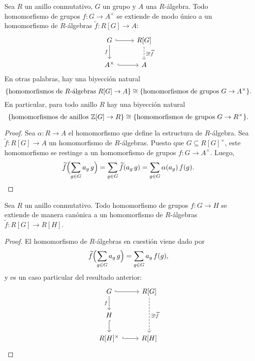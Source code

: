 \begin{proposicion}
  \label{prop:propiedad-universal-de-RG}
  Sea $R$ un anillo conmutativo, $G$ un grupo y $A$ una $R$-álgebra. Todo
  homomorfismo de grupos $f\colon G\to A^\times$ se extiende de modo único
  a un homomorfismo de $R$-álgebras $\widetilde{f}\colon R [G] \to A$:
  \[ \begin{tikzcd}
      G \ar[hookrightarrow]{r}\ar{d}[swap]{f} &
      R [G]\ar[dashed]{d}{\exists ! \widetilde{f}} \\
      A^\times \ar[hookrightarrow]{r} & A
    \end{tikzcd} \]
  En otras palabras, hay una biyección natural
  \[ \{ \text{homomorfismos de }R\text{-álgebras }R [G]\to A \} \cong
     \{ \text{homomorfismos de grupos }G\to A^\times \}. \]
  En particular, para todo anillo $R$ hay una biyección natural
  \[ \{ \text{homomorfismos de anillos }\mathbb{Z} [G]\to R \} \cong
     \{ \text{homomorfismos de grupos }G\to R^\times \}. \]

  \begin{proof}
    Sea $\alpha\colon R\to A$ el homomorfismo que define la estructura
    de $R$-álgebra. Sea $\widetilde{f}\colon R [G] \to A$ un homomorfismo
    de $R$-álgebras. Puesto que $G \subseteq R [G]^\times$, este homomorfismo
    se restinge a un homomorfismo de grupos $f\colon G\to A^\times$. Luego,
    \[ \widetilde{f} \Bigl( \sum_{g\in G} a_g\,g \Bigr) =
       \sum_{g\in G} \widetilde{f} (a_g\,g) =
       \sum_{g\in G} \alpha (a_g)\,f (g). \]
  \end{proof}
\end{proposicion}

\begin{corolario}
  Sea $R$ un anillo conmutativo. Todo homomorfismo de grupos $f\colon G\to H$
  se extiende de manera canónica a un homomorfismo de $R$-álgebras
  $\widetilde{f}\colon R [G] \to R [H]$.

  \begin{proof}
    El homomorfismo de $R$-álgebras en cuestión viene dado por
    \[ \widetilde{f} \Bigl( \sum_{g\in G} a_g\,g \Bigr) =
       \sum_{g\in G} a_g\,f (g), \]
    y es un caso particular del resultado anterior:
    \[ \begin{tikzcd}
        G \ar[hookrightarrow]{r}\ar{d}[swap]{f} &
        R [G]\ar[dashed]{dd}{\exists ! \widetilde{f}} \\
        H\ar[hookrightarrow]{d} \\
        R [H]^\times \ar[hookrightarrow]{r} & R [H]
      \end{tikzcd} \]
  \end{proof}
\end{corolario}

